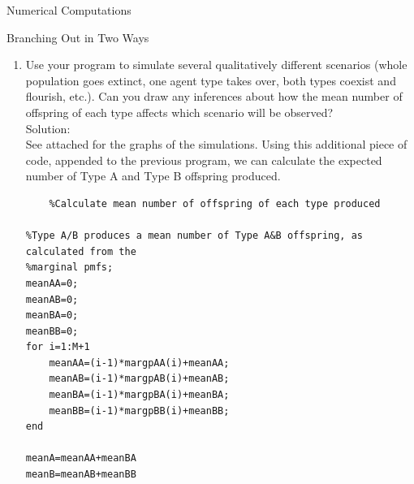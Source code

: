 \documentclass[12pt]{article}
\numberwithin{equation}{section}
\begin{document}
\begin{section}{Numerical Computations}
\begin{subsection}{Branching Out in Two Ways}
\begin{enumerate}
\begin{lstlisting}
        else %If type of offspring of B are independent

            %Simulation of Type A offspring produced by Type B's
            x=rand();
            i=1;
            while x>0
                x=x-margpBA(i);
                i=i+1;
            end
            yBA(k)=i-2;

            %Simulation of Type B offspring produced by Type A's
            z=rand();
            j=1;
            while z>0
                z=z-margpBB(j);
                j=j+1;
            end
            yBB(k)=j-2;
        end
        pBA(n)=yBA(k)+pBA(n);
        pBB(n)=yBB(k)+pBB(n);
    end

    %Stochastic Update Rule
    A(n+1)=pAA(n)+pBA(n);
    B(n+1)=pAB(n)+pBB(n);
end
n=1:N;
stairs(n,A);
hold on
stairs(n,B);
legend('# of Type A individuals', '# of Type B individuals');
title('Two Type Branching Process');

\end{lstlisting}

\item Use your program to simulate several qualitatively different scenarios (whole population goes extinct, one agent type takes over, both types coexist and flourish, etc.). Can you draw any inferences about how the mean number of offspring of each type affects which scenario will be observed?\\

    Solution:\\

    See attached for the graphs of the simulations.
    Using this additional piece of code, appended to the previous program, we can calculate the expected number of Type A and Type B offspring produced.
    \begin{lstlisting}
    %Calculate mean number of offspring of each type produced

%Type A/B produces a mean number of Type A&B offspring, as calculated from the
%marginal pmfs;
meanAA=0;
meanAB=0;
meanBA=0;
meanBB=0;
for i=1:M+1
    meanAA=(i-1)*margpAA(i)+meanAA;
    meanAB=(i-1)*margpAB(i)+meanAB;
    meanBA=(i-1)*margpBA(i)+meanBA;
    meanBB=(i-1)*margpBB(i)+meanBB;
end

meanA=meanAA+meanBA
meanB=meanAB+meanBB
\end{lstlisting}


\end{enumerate}
\end{subsection}
\end{section}
\end{document}
